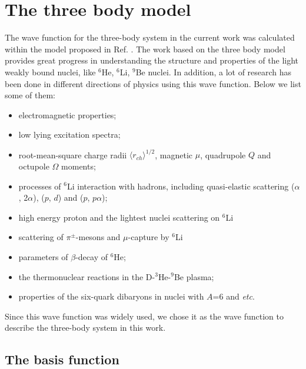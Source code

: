 \documentclass[
12pt, %
oneside, %
english, %
onehalfspacing, %
onehalfspacing, %
headsepline, %
]{MastersDoctoralThesis} %
\begin{document}
\chapter{The three body model}
The wave function for the three-body system in the current work was calculated within the model proposed in Ref. \cite{kukulin1977stochastic}.
 The work based on the three body model provides great progress in understanding the structure and properties of the light weakly bound nuclei, like $^6$He, $^6$Li, $^9$Be nuclei. 
 In addition, a lot of research has been done in different directions of physics \cite{kukulin1977stochastic, golovkov1981cross, kukulin1984detailed, glozman1984study, kukulin1986detailed, voronchev1994study, zhusupov1994elastic, kukulin2010, seksembayev2018, kakenov2020properties} using this wave function. Below we list some of them:
\begin{itemize}
\item electromagnetic properties;
\item  low lying excitation spectra;
\item root-mean-square charge radii $\langle r_{ch}\rangle^{1/2}$,  magnetic $\mu$, quadrupole $Q$ and octupole $\Omega$  moments;
\item processes of $^6$Li interaction with hadrons, including quasi-elastic scattering ($ \alpha $, 2$\alpha $), ($ p $, $ d $) and ($p$, $p\alpha$);
\item high energy proton and the lightest nuclei scattering on $^6$Li
\item scattering of $\pi^{\pm}$-mesons and $\mu$-capture by $^6$Li
\item parameters of $\beta$-decay of $^6$He;
\item the thermonuclear reactions in the D-$^3$He-$^9$Be plasma;
\item properties of the six-quark dibaryons in nuclei with $A$=6 and \textit{etc}.
\end{itemize}
Since this wave function was widely used, we chose it as the wave function to describe the three-body system in this work.



\section{The basis function}
\end{document}
